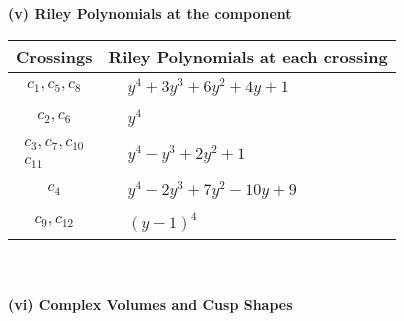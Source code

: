 \documentclass[1p]{elsarticle_modified}
\theoremstyle{definition}
\begin{document}
\newpage\renewcommand{\arraystretch}{1}
\flushleft \textbf{(v) Riley Polynomials at the component}\newline \\
\begin{tabular}{m{50pt}|m{274pt}}
Crossings & \hspace{64pt}Riley Polynomials at each crossing \\
\hline $$\begin{aligned}c_{1},c_{5},c_{8}\end{aligned}$$&$\begin{aligned}
&y^4+3 y^3+6 y^2+4 y+1
\end{aligned}$\\
\hline $$\begin{aligned}c_{2},c_{6}\end{aligned}$$&$\begin{aligned}
&y^4
\end{aligned}$\\
\hline $$\begin{aligned}c_{3},c_{7},c_{10}\\c_{11}\end{aligned}$$&$\begin{aligned}
&y^4- y^3+2 y^2+1
\end{aligned}$\\
\hline $$\begin{aligned}c_{4}\end{aligned}$$&$\begin{aligned}
&y^4-2 y^3+7 y^2-10 y+9
\end{aligned}$\\
\hline $$\begin{aligned}c_{9},c_{12}\end{aligned}$$&$\begin{aligned}
&(y-1)^4
\end{aligned}$\\
\hline
\end{tabular}\\~\\
\newpage\flushleft \textbf{(vi) Complex Volumes and Cusp Shapes}
\end{document}
